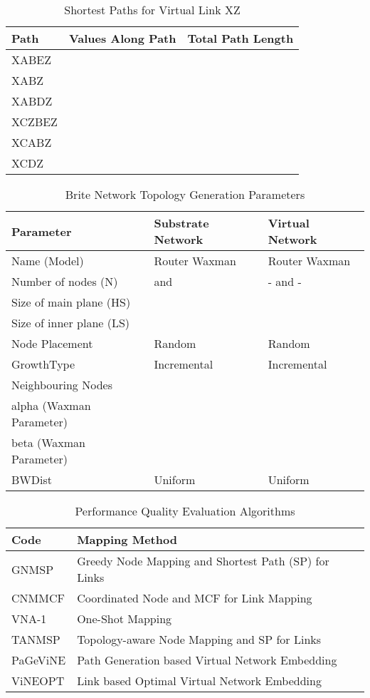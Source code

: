 \documentclass[journal]{IEEEtran}
\begin{document}
\begin{table}[ht!]
\renewcommand{\arraystretch}{1.5}
\caption{Shortest Paths for Virtual Link XZ}
\label{exrun}
\centering
{}
\begin{tabular}{l c c}
\hline
\bfseries Path & \bfseries Values Along Path & \bfseries Total Path Length\\
\hline\hline
XABEZ &  & \\
XABZ &  & \\
XABDZ &  & \\
XCZBEZ &  & \\
XCABZ &  & \\
XCDZ &  & \\
\hline
\end{tabular}
\end{table}
\begin{table}[t!]
\renewcommand{\arraystretch}{1.6}
\caption{Brite Network Topology Generation Parameters}
\label{brite}
\centering
{}
\begin{tabular}{l||l||l}
\hline
\bfseries Parameter & \bfseries Substrate Network & \bfseries Virtual Network\\
\hline\hline
Name (Model) & Router Waxman & Router Waxman\\
Number of nodes (N) &  and  & - and -\\
Size of main plane (HS) &  & \\
Size of inner plane (LS) &  & \\
Node Placement & Random & Random \\
GrowthType & Incremental & Incremental\\
Neighbouring Nodes &  & \\
alpha (Waxman Parameter) &  & \\
beta (Waxman Parameter) &  & \\
BWDist & Uniform & Uniform\\
\hline
\end{tabular}
\end{table}
\begin{table}[t!]
\renewcommand{\arraystretch}{1.5}
\caption{Performance Quality Evaluation Algorithms}
\label{table1}
\centering
{}
\begin{tabular}{l||l}
\hline
\bfseries Code & \bfseries Mapping Method\\
\hline\hline
GNMSP & Greedy Node Mapping and Shortest Path (SP) for Links\cite{Yu08}\\
CNMMCF & Coordinated Node and MCF for Link Mapping\cite{Chowdhury12}\\
VNA-1  & One-Shot Mapping\cite{Zhu06}\\
TANMSP & Topology-aware Node Mapping and SP for Links \cite{ChengXiang2011} \\
PaGeViNE & Path Generation based Virtual Network Embedding\\
ViNEOPT & Link based Optimal Virtual Network Embedding\\
\hline
\end{tabular}
\end{table}
\end{document}
